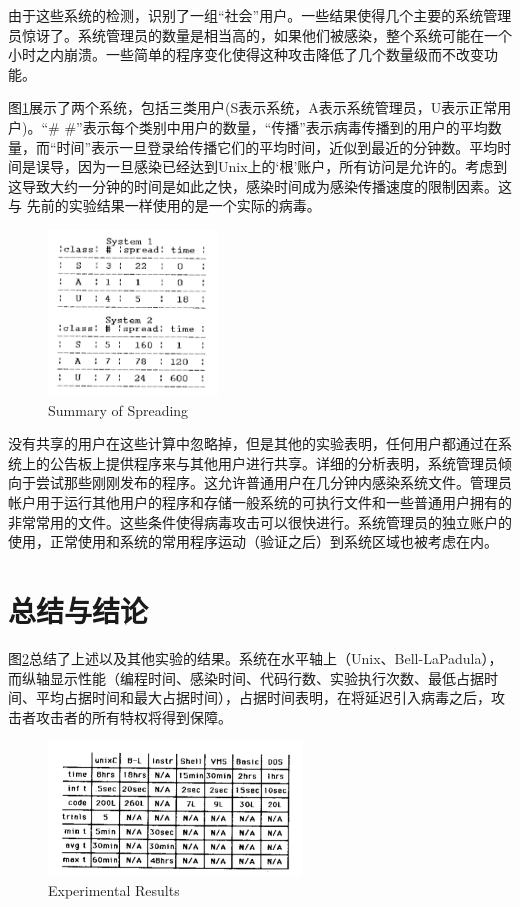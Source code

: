 由于这些系统的检测，识别了一组“社会”用户。一些结果使得几个主要的系统管理员惊讶了。系统管理员的数量是相当高的，如果他们被感染，整个系统可能在一个小时之内崩溃。一些简单的程序变化使得这种攻击降低了几个数量级而不改变功能。


图\ref{fig10}展示了两个系统，包括三类用户(S表示系统，A表示系统管理员，U表示正常用户)。“\# \#”表示每个类别中用户的数量，“传播”表示病毒传播到的用户的平均数量，而“时间”表示一旦登录给传播它们的平均时间，近似到最近的分钟数。平均时间是误导，因为一旦感染已经达到Unix上的‘根’账户，所有访问是允许的。考虑到这导致大约一分钟的时间是如此之快，感染时间成为感染传播速度的限制因素。这与
先前的实验结果一样使用的是一个实际的病毒。


\begin{figure}[h!]
    \centering
    \includegraphics[width=0.40\textwidth]{figure/fig10.png}
    \caption{Summary of Spreading} 
    \label{fig10}
\end{figure} 

没有共享的用户在这些计算中忽略掉，但是其他的实验表明，任何用户都通过在系统上的公告板上提供程序来与其他用户进行共享。详细的分析表明，系统管理员倾向于尝试那些刚刚发布的程序。这允许普通用户在几分钟内感染系统文件。管理员帐户用于运行其他用户的程序和存储一般系统的可执行文件和一些普通用户拥有的非常常用的文件。这些条件使得病毒攻击可以很快进行。系统管理员的独立账户的使用，正常使用和系统的常用程序运动（验证之后）到系统区域也被考虑在内。

\section{总结与结论}

图\ref{fig11}总结了上述以及其他实验的结果。系统在水平轴上（Unix、Bell-LaPadula），而纵轴显示性能（编程时间、感染时间、代码行数、实验执行次数、最低占据时间、平均占据时间和最大占据时间），占据时间表明，在将延迟引入病毒之后，攻击者攻击者的所有特权将得到保障。

\begin{figure}[h!]
    \centering
    \includegraphics[width=0.60\textwidth]{figure/fig11.png}
    \caption{Experimental Results} 
    \label{fig11}
\end{figure} 

